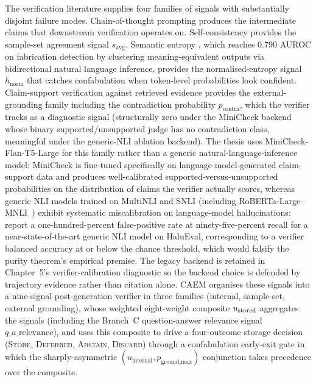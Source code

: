 The verification literature supplies four families of signals with substantially disjoint failure modes. Chain-of-thought prompting \cite{NEURIPS2022_9d560961} produces the intermediate claims that downstream verification operates on. Self-consistency \cite{wang2023selfconsistency} provides the sample-set agreement signal $s_{\text{avg}}$. Semantic entropy \citep{farquhar2024semantic, kuhn2023semantic}, which reaches 0.790 AUROC on fabrication detection by clustering meaning-equivalent outputs via bidirectional natural language inference, provides the normalised-entropy signal $h_{\text{norm}}$ that catches confabulation when token-level probabilities look confident. Claim-support verification against retrieved evidence provides the external-grounding family including the contradiction probability $p_{\text{contra}}$, which the verifier tracks as a diagnostic signal (structurally zero under the MiniCheck backend whose binary supported/unsupported judge has no contradiction class, meaningful under the generic-NLI ablation backend). The thesis uses MiniCheck-Flan-T5-Large \citep{tang2024minicheck} for this family rather than a generic natural-language-inference model: MiniCheck is fine-tuned specifically on language-model-generated claim-support data and produces well-calibrated supported-versus-unsupported probabilities on the distribution of claims the verifier actually scores, whereas generic NLI models trained on MultiNLI and SNLI (including RoBERTa-Large-MNLI~\cite{liu2019roberta}) exhibit systematic miscalibration on language-model hallucinations: \citet{semanticillusion2025} report a one-hundred-percent false-positive rate at ninety-five-percent recall for a near-state-of-the-art generic NLI model on HaluEval, corresponding to a verifier balanced accuracy at or below the chance threshold, which would falsify the purity theorem's empirical premise. The legacy backend is retained in Chapter~5's verifier-calibration diagnostic so the backend choice is defended by trajectory evidence rather than citation alone. CAEM organises these signals into a nine-signal post-generation verifier in three families (internal, sample-set, external grounding), whose weighted eight-weight composite $u_{\text{stored}}$ aggregates the signals (including the Branch~C question-answer relevance signal $q\_a\_\text{relevance}$), and uses this composite to drive a four-outcome storage decision (\textsc{Store}, \textsc{Deferred}, \textsc{Abstain}, \textsc{Discard}) through a confabulation early-exit gate in which the sharply-asymmetric $(u_{\text{internal}}, p_{\text{ground,max}})$ conjunction takes precedence over the composite.

